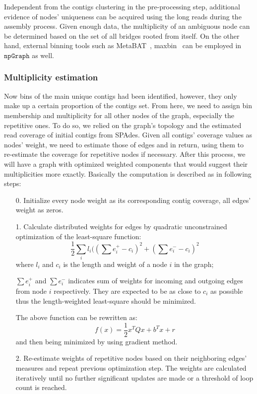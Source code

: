 \documentclass[10pt,letterpaper]{article}
\newcommand{\npgraph}{$\mathtt{npGraph}$}
\begin{document}
Independent from the contigs clustering in the pre-processing step, additional evidence of nodes' uniqueness can be acquired using the long reads during the assembly process. Given enough data, the multiplicity of an ambiguous node can be determined based on the set of all bridges rooted from itself.
On the other hand, external binning tools such as MetaBAT~\cite{Kang2015metabat}, maxbin~\cite{Wu2014maxbin} can be employed in \npgraph{} as well.
\subsubsection*{Multiplicity estimation}
Now bins of the main unique contigs had been identified, however, they only make up a certain proportion of the contigs set. From here, we need to assign bin membership and multiplicity for all other nodes of the graph, especially the repetitive ones. To do so, we relied on the graph's topology and the estimated read coverage of initial contigs from SPAdes.
Given all contigs' coverage values as nodes' weight, we need to estimate those of edges and in return, using them to re-estimate the coverage for repetitive nodes if necessary. After this process, we will have a graph with optimized weighted components that would suggest their multiplicities more exactly. Basically the computation is described as in following steps:

\begin{itemize}
\item[0.] Initialize every node weight as its corresponding contig coverage, all edges' weight as zeros.
\item[1.] Calculate distributed weights for edges by quadratic unconstrained optimization of the least-square function:
$$\frac{1}{2}\sum_{i}{l_i((\sum{e^{+}_{i}}-c_i)^2+(\sum{e^{-}_{i}}-c_i)^2}$$
where $l_i$ and $c_i$ is the length and weight of a node $i$ in the graph;

$\sum{e^{+}_{i}}$ and $\sum{e^{-}_{i}}$ indicates sum of weights for incoming and outgoing edges from node $i$ respectively. They are expected to be as close to $c_i$ as possible thus the length-weighted least-square should be minimized. 

The above function can be rewritten as:
$$f(x)=\frac{1}{2}x^TQx + b^Tx + r$$
and then being minimized by using gradient method.
\item[2.] Re-estimate weights of repetitive nodes based on their neighboring edges' measures and repeat previous optimization step. 
The weights are calculated iteratively until no further significant updates are made or a threshold of loop count is reached.
\end{itemize}
\end{document}
